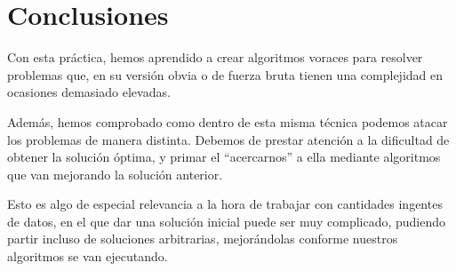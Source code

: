 \documentclass[10pt,a4paper]{article}
\begin{document}
\section{Conclusiones}

Con esta práctica, hemos aprendido a crear algoritmos voraces para resolver problemas que, en su versión obvia o de fuerza bruta tienen una complejidad en ocasiones demasiado elevadas.

Además, hemos comprobado como dentro de esta misma técnica podemos atacar los problemas de manera distinta. Debemos de prestar atención a la dificultad de obtener la solución óptima, y primar el ``acercarnos'' a ella mediante algoritmos que van mejorando la solución anterior.

Esto es algo de especial relevancia a la hora de trabajar con cantidades ingentes de datos, en el que dar una solución inicial puede ser muy complicado, pudiendo partir incluso de soluciones arbitrarias, mejorándolas conforme nuestros algoritmos se van ejecutando. 
\end{document}
